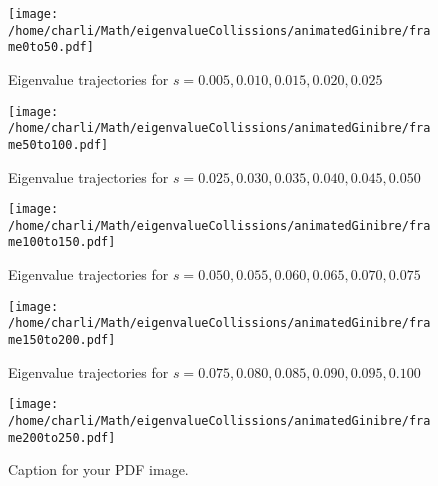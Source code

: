 \documentclass{article}
\begin{document}
	\newpage

	\begin{figure}[htbp]
		\centering
		\texttt{[image: /home/charli/Math/eigenvalueCollissions/animatedGinibre/frame0to50.pdf]}
		\caption{Eigenvalue trajectories for $s= 0.005, 0.010, 0.015, 0.020, 0.025$ }
		\label{fig:pdf_image}
	\end{figure}


	\newpage

	\begin{figure}[htbp]
		\centering
		\texttt{[image: /home/charli/Math/eigenvalueCollissions/animatedGinibre/frame50to100.pdf]}
		\caption{Eigenvalue trajectories for $s= 0.025, 0.030, 0.035, 0.040, 0.045, 0.050$ }
		\label{fig:pdf_image}
	\end{figure}
	

\newpage


\begin{figure}[htbp]
    \centering
    \texttt{[image: /home/charli/Math/eigenvalueCollissions/animatedGinibre/frame100to150.pdf]}
	\caption{Eigenvalue trajectories for $s= 0.050, 0.055, 0.060, 0.065, 0.070, 0.075$ }
    \label{fig:pdf_image}
\end{figure}


\newpage


\begin{figure}[htbp]
    \centering
    \texttt{[image: /home/charli/Math/eigenvalueCollissions/animatedGinibre/frame150to200.pdf]}
	\caption{Eigenvalue trajectories for $s= 0.075, 0.080, 0.085, 0.090, 0.095, 0.100$ }
    \label{fig:pdf_image}
\end{figure}


\newpage


\begin{figure}[htbp]
    \centering
    \texttt{[image: /home/charli/Math/eigenvalueCollissions/animatedGinibre/frame200to250.pdf]}
    \caption{Caption for your PDF image.}
    \label{fig:pdf_image}
\end{figure}
\end{document}

